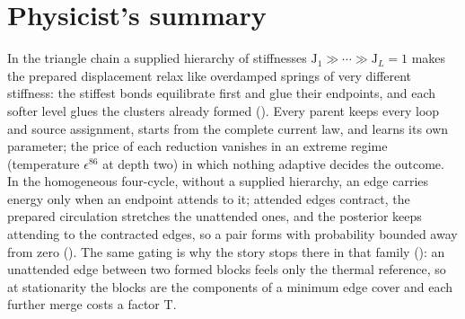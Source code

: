 \section*{Physicist's summary}

In the triangle chain a supplied hierarchy of stiffnesses
\(\mathrm J_1\gg\cdots\gg\mathrm J_L=1\) makes the prepared displacement relax
like overdamped springs of very different stiffness: the stiffest bonds
equilibrate first and glue their endpoints, and each softer level glues the
clusters already formed (). Every
parent keeps every loop and source assignment, starts from the complete
current law, and learns its own parameter; the price of each reduction
vanishes in an extreme regime (temperature \(\epsilon^{86}\) at depth two) in
which nothing adaptive decides the outcome. In the homogeneous four-cycle, without
a supplied hierarchy, an edge carries energy only when an endpoint attends to
it; attended edges contract, the prepared circulation stretches the unattended
ones, and the posterior keeps attending to the contracted edges, so a pair
forms with probability bounded away from zero
(). The same gating
is why the story stops there in that family
(): an unattended edge between two formed
blocks feels only the thermal reference, so at stationarity the blocks are
the components of a minimum edge cover and each further merge costs a factor
\(\mathrm T\).

